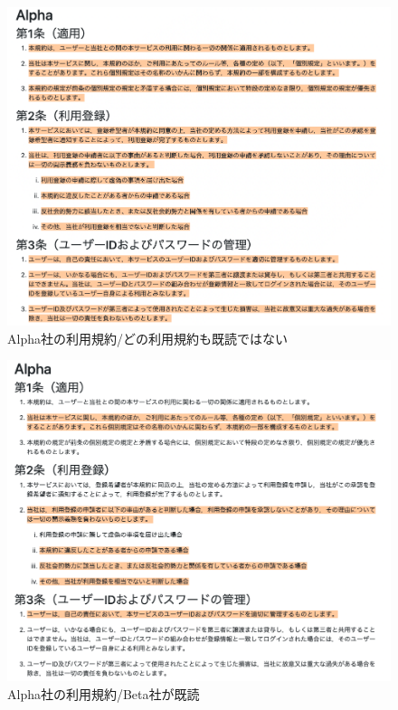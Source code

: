 \begin{figure}[h]
  \begin{center}
      \includegraphics[width=16cm]{img/alpha.png}
      \caption{Alpha社の利用規約/どの利用規約も既読ではない}
      \label{img:Alpha社の利用規約/どの利用規約も既読ではない}
  \end{center}
\end{figure}
\begin{figure}[h]
  \begin{center}
      \includegraphics[width=16cm]{img/alpha_b.png}
      \caption{Alpha社の利用規約/Beta社が既読}
      \label{img:Alpha社の利用規約/Beta社が既読}
  \end{center}
\end{figure}
